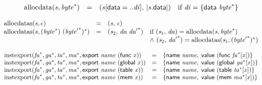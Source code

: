 $$
\begin{array}{@{}lcl@{}l@{}}
{\mathrm{allocdata}}({\mathit{s}}, {{\mathit{byte}}^\ast}) &=& ({\mathit{s}}{}[\mathsf{data} = ..{\mathit{di}}],\, {|{\mathit{s}}.\mathsf{data}|}) &\quad
  \mbox{if}~{\mathit{di}} = \{ \begin{array}[t]{@{}l@{}}
\mathsf{data}~{{\mathit{byte}}^\ast} \}\end{array} \\
\end{array}
$$

$$
\begin{array}{@{}lcl@{}l@{}}
{\mathrm{allocdatas}}({\mathit{s}}, \epsilon) &=& ({\mathit{s}},\, \epsilon) &  \\
{\mathrm{allocdatas}}({\mathit{s}}, ({{\mathit{byte}}^\ast})~{({{\mathit{byte}'}^\ast})^\ast}) &=& ({\mathit{s}}_{{2}},\, {\mathit{da}}~{{\mathit{da}'}^\ast}) &\quad
  \mbox{if}~({\mathit{s}}_{{1}},\, {\mathit{da}}) = {\mathrm{allocdata}}({\mathit{s}}, {{\mathit{byte}}^\ast}) \\
 &&&\quad {\land}~({\mathit{s}}_{{2}},\, {{\mathit{da}'}^\ast}) = {\mathrm{allocdatas}}({\mathit{s}}_{{1}}, {({{\mathit{byte}'}^\ast})^\ast}) \\
\end{array}
$$

\vspace{1ex}

$$
\begin{array}{@{}lcl@{}l@{}}
{\mathrm{instexport}}({{\mathit{fa}}^\ast}, {{\mathit{ga}}^\ast}, {{\mathit{ta}}^\ast}, {{\mathit{ma}}^\ast}, \mathsf{export}~{\mathit{name}}~(\mathsf{func}~{\mathit{x}})) &=& \{ \begin{array}[t]{@{}l@{}}
\mathsf{name}~{\mathit{name}},\; \mathsf{value}~(\mathsf{func}~{{\mathit{fa}}^\ast}{}[{\mathit{x}}]) \}\end{array} &  \\
{\mathrm{instexport}}({{\mathit{fa}}^\ast}, {{\mathit{ga}}^\ast}, {{\mathit{ta}}^\ast}, {{\mathit{ma}}^\ast}, \mathsf{export}~{\mathit{name}}~(\mathsf{global}~{\mathit{x}})) &=& \{ \begin{array}[t]{@{}l@{}}
\mathsf{name}~{\mathit{name}},\; \mathsf{value}~(\mathsf{global}~{{\mathit{ga}}^\ast}{}[{\mathit{x}}]) \}\end{array} &  \\
{\mathrm{instexport}}({{\mathit{fa}}^\ast}, {{\mathit{ga}}^\ast}, {{\mathit{ta}}^\ast}, {{\mathit{ma}}^\ast}, \mathsf{export}~{\mathit{name}}~(\mathsf{table}~{\mathit{x}})) &=& \{ \begin{array}[t]{@{}l@{}}
\mathsf{name}~{\mathit{name}},\; \mathsf{value}~(\mathsf{table}~{{\mathit{ta}}^\ast}{}[{\mathit{x}}]) \}\end{array} &  \\
{\mathrm{instexport}}({{\mathit{fa}}^\ast}, {{\mathit{ga}}^\ast}, {{\mathit{ta}}^\ast}, {{\mathit{ma}}^\ast}, \mathsf{export}~{\mathit{name}}~(\mathsf{mem}~{\mathit{x}})) &=& \{ \begin{array}[t]{@{}l@{}}
\mathsf{name}~{\mathit{name}},\; \mathsf{value}~(\mathsf{mem}~{{\mathit{ma}}^\ast}{}[{\mathit{x}}]) \}\end{array} &  \\
\end{array}
$$

